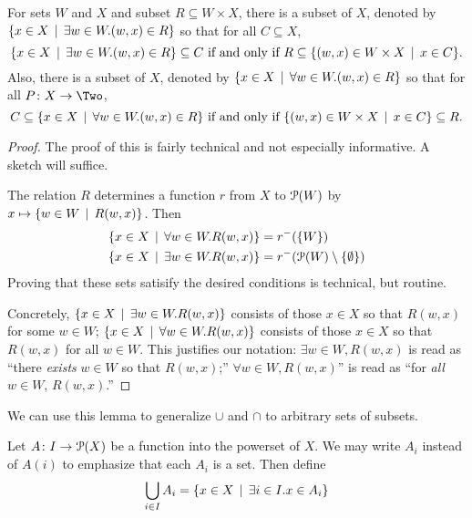 \begin{lemma}
	For sets $W$ and $X$ and subset $R\subseteq{W\times X}$, there is a subset of $X$, denoted by $\{x\in X\,\mid\, \exists w\in W.(w,x)\in R\}$ so that for all $C\subseteq X$, 
	\[\text{$\{x\in X\,\mid\, \exists w\in W.(w,x)\in R\} \subseteq C$ if and only if $R \subseteq \{(w,x)\in W\times X\,\mid\, x\in C\}$}.\]
	Also, there is a subset of $X$, denoted by $\{x\in X\,\mid\, \forall w\in W.(w,x)\in R\}$ so that for all $\fromto PX\Two$,
	\[\text{$C \subseteq \{x\in X\,\mid\, \forall w\in W.(w,x)\in R\}$ if and only if $\{(w,x) \in W\times X\,\mid\, x\in C\}\subseteq R$}.\]

	\begin{proof}
		The proof of this is fairly technical and not especially informative. A sketch will suffice.
		
		The relation $R$ determines a function $r$ from $X$ to ${\mathcal{P}}(W)$ by $x\mapsto \{w\in W\,\mid\, R(w,x)\}$.
		Then 
		\begin{align*}
			\{x\in X\,\mid\, \forall w\in W.R(w,x)\} &= r^-(\{W\})\\
			\{x\in X\,\mid\, \exists w\in W.R(w,x)\} &= r^-({\mathcal{P}}(W)\setminus\{\emptyset\})
		\end{align*}
		Proving that these sets satisify the desired conditions is technical, but routine.
		 
		Concretely, $\{x\in X\,\mid\, \exists w\in W.R(w,x)\}$ consists of those $x\in X$ so that $R(w,x)$ for some $w\in W$;
		$\{x\in X\,\mid\, \forall w\in W.R(w,x)\}$ consists of those $x\in X$ so that $R(w,x)$ for all $w\in W$.
		This justifies our notation: $\exists w\in W,R(w,x)$ is read as ``there \emph{exists} $w\in W$ so that $R(w,x)$;''
		$\forall w\in W, R(w,x)$'' is read as ``for \emph{all} $w\in W$, $R(w,x)$.''
	\end{proof}
\end{lemma}

We can use this lemma to generalize $\cup$ and $\cap$ to arbitrary sets of subsets.

\begin{defn}
Let ${A}\colon{I}\to{{\mathcal{P}}(X)}$ be a function into the powerset of $X$.
We may write $A_i$ instead  of $A(i)$ to emphasize that each $A_i$ is
a set. 
Then define 
\begin{align*}
\bigcup_{i\in I}A_i &= \{x\in X\,\mid\, \exists i\in I.x\in A_i\}\\
\end{align*}
\end{defn}

